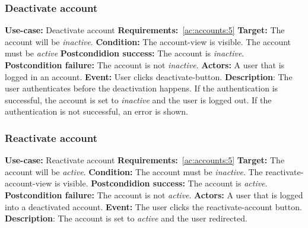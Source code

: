 \subsubsection{Deactivate account}\label{subsubsec:deactivate-acc}
\textbf{Use-case:} Deactivate account \newline
\textbf{Requirements:}~\ref{ac:accounts:5} \newline
\textbf{Target:} The account will be \textit{inactive}. \newline
\textbf{Condition:} The account-view is visible.
The account must be \textit{active} \newline
\textbf{Postcondidion success:} The account is \textit{inactive}. \newline
\textbf{Postcondition failure:} The account is not \textit{inactive}. \newline
\textbf{Actors:} A user that is logged in an account. \newline
\textbf{Event:} User clicks deactivate-button. \newline
\textbf{Description}: The user authenticates before the deactivation happens.
If the authentication is successful, the account is set to \textit{inactive} and the user is logged out.
If the authentication is not successful, an error is shown.

\subsubsection{Reactivate account}\label{subsubsec:reactivate-acc}
\textbf{Use-case:} Reactivate account \newline
\textbf{Requirements:}~\ref{ac:accounts:5} \newline
\textbf{Target:} The account will be \textit{active}. \newline
\textbf{Condition:} The account must be \textit{inactive}.
The reactivate-account-view is visible. \newline
\textbf{Postcondidion success:} The account is \textit{active}. \newline
\textbf{Postcondition failure:} The account is not \textit{active}. \newline
\textbf{Actors:} A user that is logged into a deactivated account. \newline
\textbf{Event:} The user clicks the reactivate-account button. \newline
\textbf{Description}: The account is set to \textit{active} and the user redirected.


